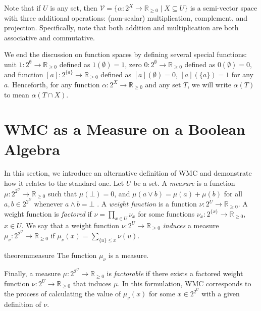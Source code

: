 \documentclass{article}
\begin{document}
Note that if $U$ is any set, then $\mathcal{V} = \{ \alpha\colon 2^X \to
\mathbb{R}_{\ge 0} \mid X \subseteq U \}$ is a semi-vector space with three
additional operations: (non-scalar) multiplication, complement, and projection.
Specifically, note that both addition and multiplication are both associative
and commutative.

We end the discussion on function spaces by defining several special functions:
unit $1\colon 2^\emptyset \to \mathbb{R}_{\ge 0}$ defined as $1(\emptyset) = 1$,
zero $0\colon 2^\emptyset \to \mathbb{R}_{\ge 0}$ defined as $0(\emptyset) = 0$,
and function $[a]\colon 2^{\{a\}} \to \mathbb{R}_{\ge 0}$ defined as
$[a](\emptyset) = 0$, $[a](\{a\}) = 1$ for any $a$. Henceforth, for any function
$\alpha\colon 2^X \to \mathbb{R}_{\ge 0}$ and any set $T$, we will write
$\alpha(T)$ to mean $\alpha(T \cap X)$.

\section{WMC as a Measure on a Boolean Algebra} \label{sec:wmc_as_measure}

In this section, we introduce an alternative definition of WMC and demonstrate
how it relates to the standard one. Let $U$ be a set. A \emph{measure} is a
function $\mu\colon 2^{2^U} \to \mathbb{R}_{\ge 0}$ such that $\mu(\bot) = 0$,
and $\mu(a \lor b) = \mu(a) + \mu(b)$ for all $a, b \in 2^{2^U}$ whenever $a
\land b = \bot$ \cite{gaifman1964concerning,DBLP:books/daglib/0090259}. A
\emph{weight function} is a function $\nu\colon 2^U \to \mathbb{R}_{\ge 0}$. A
weight function is \emph{factored} if $\nu = \prod_{x \in U} \nu_x$ for some
functions $\nu_x\colon 2^{\{x\}} \to \mathbb{R}_{\ge 0}$, $x \in U$. We say that
a weight function $\nu\colon 2^U \to \mathbb{R}_{\ge 0}$ \emph{induces} a
measure $\mu_\nu\colon 2^{2^U} \to \mathbb{R}_{\ge 0}$ if $\mu_\nu(x) =
\sum_{\{u\} \le x} \nu(u)$.

\begin{restatable}{theorem}{measure} \label{prop:measure}
  The function $\mu_\nu$ is a measure.
\end{restatable}

Finally, a measure $\mu\colon 2^{2^U} \to \mathbb{R}_{\ge 0}$ is
\emph{factorable} if there exists a factored weight function $\nu\colon 2^U \to
\mathbb{R}_{\ge 0}$ that induces $\mu$. In this formulation, WMC corresponds to
the process of calculating the value of $\mu_\nu(x)$ for some $x \in 2^{2^U}$
with a given definition of $\nu$.
\end{document}
